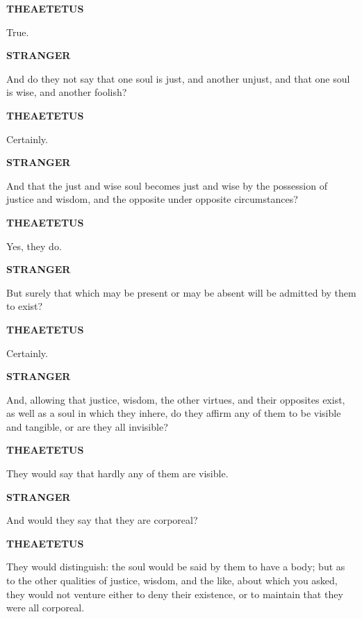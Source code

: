 \documentclass[11pt,letter]{article}
\begin{document}
\par \textbf{THEAETETUS}
\par   True.

\par \textbf{STRANGER}
\par   And do they not say that one soul is just, and another unjust, and that one soul is wise, and another foolish?

\par \textbf{THEAETETUS}
\par   Certainly.

\par \textbf{STRANGER}
\par   And that the just and wise soul becomes just and wise by the possession of justice and wisdom, and the opposite under opposite circumstances?

\par \textbf{THEAETETUS}
\par   Yes, they do.

\par \textbf{STRANGER}
\par   But surely that which may be present or may be absent will be admitted by them to exist?

\par \textbf{THEAETETUS}
\par   Certainly.

\par \textbf{STRANGER}
\par   And, allowing that justice, wisdom, the other virtues, and their opposites exist, as well as a soul in which they inhere, do they affirm any of them to be visible and tangible, or are they all invisible?

\par \textbf{THEAETETUS}
\par   They would say that hardly any of them are visible.

\par \textbf{STRANGER}
\par   And would they say that they are corporeal?

\par \textbf{THEAETETUS}
\par   They would distinguish:  the soul would be said by them to have a body; but as to the other qualities of justice, wisdom, and the like, about which you asked, they would not venture either to deny their existence, or to maintain that they were all corporeal.
\end{document}
